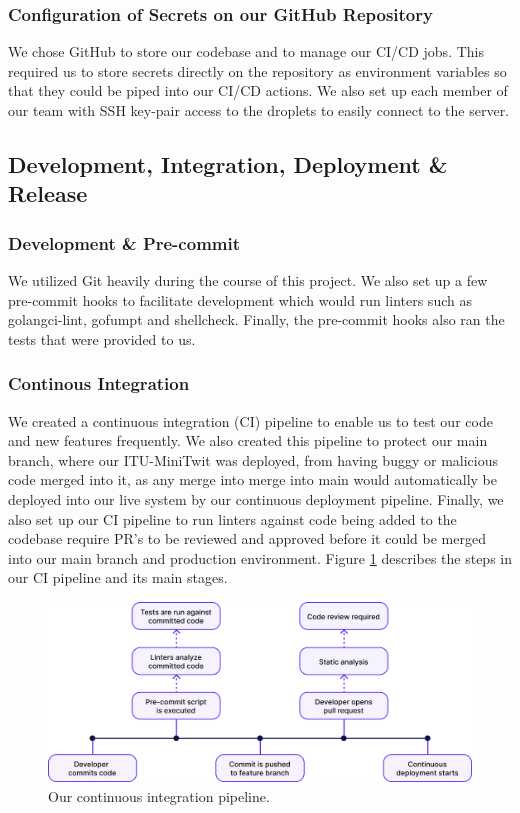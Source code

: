 \documentclass{article}
\begin{document}
\subsubsection{Configuration of Secrets on our GitHub Repository}
We chose GitHub to store our codebase and to manage our CI/CD jobs. This required us to store secrets directly on the repository as environment variables so that they could be piped into our CI/CD actions. We also set up each member of our team with SSH key-pair access to the droplets to easily connect to the server.

\subsection{Development, Integration, Deployment {\&} Release}
\subsubsection{Development {\&} Pre-commit}
We utilized Git heavily during the course of this project. We also set up a few pre-commit hooks to facilitate development which would run linters such as golangci-lint, gofumpt and shellcheck. Finally, the pre-commit hooks also ran the tests that were provided to us.


\subsubsection{Continous Integration}
We created a continuous integration (CI) pipeline to enable us to test our code and new features frequently. We also created this pipeline to protect our main branch, where our ITU-MiniTwit was deployed, from having buggy or malicious code merged into it, as any merge into merge into main would automatically be deployed into our live system by our continuous deployment pipeline. Finally, we also set up our CI pipeline to run linters against code being added to the codebase require PR's to be reviewed and approved before it could be merged into our main branch and production environment. Figure \ref{fig:ci_pipeline} describes the steps in our CI pipeline and its main stages.

\begin{figure}[ht]
    \centering
    \includegraphics[width=1.0\textwidth]{./images/CI_pipline_V2.png} 
    \caption{Our continuous integration pipeline.}
    \label{fig:ci_pipeline}
\end{figure}
\end{document}
